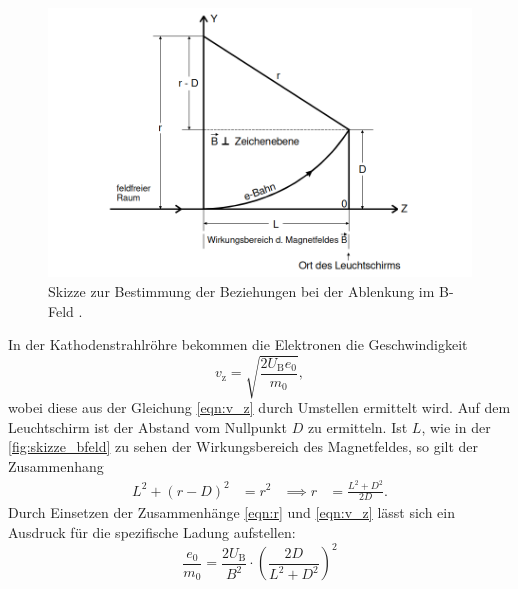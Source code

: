     \begin{figure} 
        \centering
        \includegraphics[width=\textwidth]{bilder/zeichnung_magnetfeld.png}
        \caption{Skizze zur Bestimmung der Beziehungen bei der Ablenkung im B-Feld \cite{anleitung502}.}
        \label{fig:skizze_bfeld}
    \end{figure}

    \noindent In der Kathodenstrahlröhre bekommen die Elektronen die Geschwindigkeit 
    \begin{equation*}
        v_{\text{z}} = \sqrt{\frac{2 U_{\text{B}}e_0}{m_0}},
    \end{equation*}
    wobei diese aus der Gleichung \eqref{eqn:v_z} durch Umstellen ermittelt wird. Auf dem Leuchtschirm ist der Abstand vom Nullpunkt $D$ zu ermitteln.
    Ist $L$, wie in der \autoref{fig:skizze_bfeld} zu sehen der Wirkungsbereich des Magnetfeldes, so gilt der Zusammenhang
    \begin{align*}
        L^2 + (r - D)^2 &= r^2  &\implies r &= \frac{L^2 + D^2}{2D}.
    \end{align*}
    Durch Einsetzen der Zusammenhänge \eqref{eqn:r} und \eqref{eqn:v_z} lässt sich ein Ausdruck für die spezifische Ladung aufstellen:
    \begin{equation*}
        \frac{e_0}{m_0} = \frac{2 U_{\text{B}}}{B^2} \cdot \left(\frac{2D}{L^2 + D^2}\right)^2
    \end{equation*}